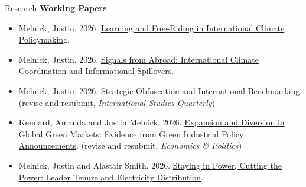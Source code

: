 \documentclass{resume} %
\begin{document}
\begin{rSection}{Research}
\textbf{Working Papers}
\begin{itemize}
 \item Melnick, Justin. 2026. \href{https://justinmelnick.github.io/papers/complementarities/paper.pdf}{Learning and Free-Riding in International Climate Policymaking}.
                    \item Melnick, Justin. 2026. \href{https://justinmelnick.github.io/papers/inaction/paper.pdf}{Signals from Abroad: International Climate Coordination and Informational Spillovers}.
                                             \item Melnick, Justin. 2026. \href{https://justinmelnick.github.io/papers/pledge/paper.pdf}{Strategic Obfuscation and International Benchmarking}.    (revise and resubmit, \textit{International Studies Quarterly})                    
                        \item Kennard, Amanda and Justin Melnick. 2026. \href{https://justinmelnick.github.io/papers/scam/paper.pdf}{Expansion and Diversion in Global Green Markets: Evidence from Green Industrial Policy Announcements}. (revise and resubmit, \textit{Economics \& Politics})                    
                        \item Melnick, Justin and Alastair Smith. 2026. \href{https://justinmelnick.github.io/papers/electricity/paper.pdf}{Staying in Power, Cutting the Power: Leader Tenure and Electricity Distribution}. 
\end{itemize}

\end{rSection}
\end{document}
